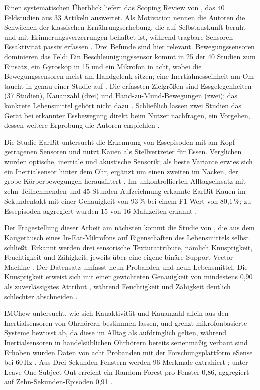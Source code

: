 \documentclass[11pt]{article}
\begin{document}
Einen systematischen Überblick liefert das Scoping Review von \citet{Bell2020}, das 40
Feldstudien aus 33 Artikeln auswertet. Als Motivation nennen die Autoren die Schwächen der
klassischen Ernährungserhebung, die auf Selbstauskunft beruht und mit Erinnerungs\-ver\-zer\-run\-gen
behaftet ist, während tragbare Sensoren Essaktivität passiv erfassen \citep[S.~1]{Bell2020}.
Drei Befunde sind hier relevant. Bewegungssensoren dominieren das Feld: Ein
Beschleunigungssensor kommt in 25 der 40 Studien zum Einsatz, ein Gyroskop in 15 und ein
Mikrofon in acht, wobei die Bewegungssensoren meist am Handgelenk sitzen; eine
Inertialmesseinheit am Ohr taucht in genau einer Studie auf \citep[S.~9--10]{Bell2020}. Die
erfassten Zielgrößen sind Essgelegenheiten (37 Studien), Kauanzahl (drei) und
Hand-zu-Mund-Bewegungen (zwei); das konkrete Lebensmittel gehört nicht dazu
\citep[S.~10]{Bell2020}. Schließlich lassen zwei Studien das Gerät bei erkannter
Essbewegung direkt beim Nutzer nachfragen, ein Vorgehen, dessen weitere Erprobung die
Autoren empfehlen \citep[S.~9 und S.~11]{Bell2020}.

Die Studie EarBit \citep{Bedri2017} untersucht die Erkennung von Essepisoden mit am Kopf
getragenen Sensoren und nutzt Kauen als Stellvertreter für Essen. Verglichen wurden
optische, inertiale und akustische Sensorik; als beste Variante erwies sich ein
Inertialsensor hinter dem Ohr, ergänzt um einen zweiten im Nacken, der grobe
Körperbewegungen herausfiltert \citep[S.~3 und S.~11]{Bedri2017}. Im unkontrollierten
Alltagseinsatz mit zehn Teilnehmenden und 45 Stunden Aufzeichnung erkannte EarBit Kauen im
Sekundentakt mit einer Genauigkeit von 93\,\% bei einem F1-Wert von 80,1\,\%; zu
Essepisoden aggregiert wurden 15 von 16 Mahlzeiten erkannt \citep[S.~3 und S.~16]{Bedri2017}.

Der Fragestellung dieser Arbeit am nächsten kommt die Studie von
\citet{Papapanagiotou2021}, die aus dem Kaugeräusch eines In-Ear-Mikrofons auf
Eigenschaften des Lebensmittels selbst schließt. Erkannt werden drei sensorische
Texturattribute, nämlich Knusprigkeit, Feuchtigkeit und Zähigkeit, jeweils über eine eigene
binäre Support Vector Machine \citep[S.~1 und S.~3]{Papapanagiotou2021}. Der Datensatz
umfasst neun Probanden und neun Lebensmittel. Die Knusprigkeit erweist sich mit einer
gewichteten Genauigkeit von mindestens 0,90 als zuverlässigstes Attribut
\citep[S.~10]{Papapanagiotou2021}, während Feuchtigkeit und Zähigkeit deutlich schlechter
abschneiden \citep[S.~8]{Papapanagiotou2021}.

IMChew \citep{Ketmalasiri2024} untersucht, wie sich Kauaktivität und Kauanzahl allein aus
den Inertialsensoren von Ohrhörern bestimmen lassen, und grenzt mikrofonbasierte Systeme
bewusst ab, da diese im Alltag als aufdringlich gelten, während Inertialsensoren in
handelsüblichen Ohrhörern bereits serienmäßig verbaut sind \citep[S.~29]{Ketmalasiri2024}.
Erhoben wurden Daten von acht Probanden mit der Forschungsplattform eSense bei 60\,Hz
\citep[S.~31]{Ketmalasiri2024}. Aus Drei-Sekunden-Fenstern werden 96 Merkmale extrahiert
\citep[S.~30--31]{Ketmalasiri2024}; unter Leave-One-Subject-Out erreicht ein Random Forest
pro Fenster 0,86, aggregiert auf Zehn-Sekunden-Episoden 0,91 \citep[S.~32]{Ketmalasiri2024}.
\end{document}
